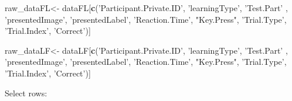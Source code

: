 \documentclass[
]{article}
\newenvironment{Shaded}{\begin{snugshade}}{\end{snugshade}}
\newcommand{\KeywordTok}[1]{\textcolor[rgb]{0.13,0.29,0.53}{\textbf{#1}}}
\newcommand{\NormalTok}[1]{#1}
\newcommand{\StringTok}[1]{\textcolor[rgb]{0.31,0.60,0.02}{#1}}
\begin{document}
\begin{Shaded}
\begin{Highlighting}[]
\NormalTok{raw_dataFL<-}\StringTok{ }\NormalTok{dataFL[}\KeywordTok{c}\NormalTok{(}\StringTok{'Participant.Private.ID'}\NormalTok{, }\StringTok{'learningType'}\NormalTok{, }\StringTok{'Test.Part'}\NormalTok{ , }
         \StringTok{'presentedImage'}\NormalTok{, }\StringTok{'presentedLabel'}\NormalTok{, }\StringTok{'Reaction.Time'}\NormalTok{, }\StringTok{"Key.Press"}\NormalTok{,}
          \StringTok{'Trial.Type'}\NormalTok{, }\StringTok{'Trial.Index'}\NormalTok{, }\StringTok{'Correct'}\NormalTok{)]}

\NormalTok{raw_dataLF<-}\StringTok{ }\NormalTok{dataLF[}\KeywordTok{c}\NormalTok{(}\StringTok{'Participant.Private.ID'}\NormalTok{, }\StringTok{'learningType'}\NormalTok{, }\StringTok{'Test.Part'}\NormalTok{ , }
         \StringTok{'presentedImage'}\NormalTok{, }\StringTok{'presentedLabel'}\NormalTok{, }\StringTok{'Reaction.Time'}\NormalTok{, }\StringTok{"Key.Press"}\NormalTok{,}
          \StringTok{'Trial.Type'}\NormalTok{, }\StringTok{'Trial.Index'}\NormalTok{, }\StringTok{'Correct'}\NormalTok{)]}
\end{Highlighting}
\end{Shaded}

Select rows:
\end{document}
